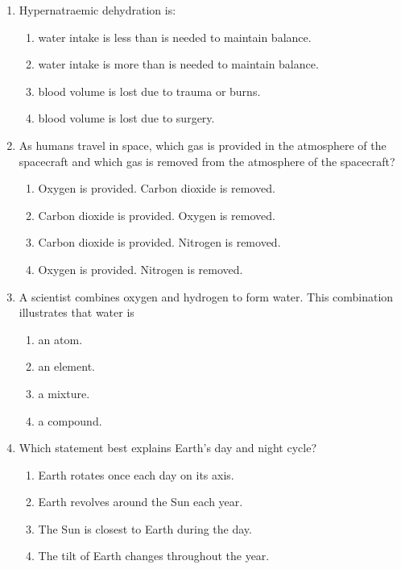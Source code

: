 \documentclass[12pt]{article}
\begin{document}
\begin{enumerate}[label=\arabic*.]
\begin{enumerate}[label=(\alph*)]
    \item enzymes in the lysosome are released to the cytosol
    \item protons are actively pumped into the lysosome
\end{enumerate}
\item Hypernatraemic dehydration is:
\begin{enumerate}[label=(\alph*)]
    \item water intake is less than is needed to maintain balance.
    \item water intake is more than is needed to maintain balance.
    \item blood volume is lost due to trauma or burns.
    \item blood volume is lost due to surgery.
\end{enumerate}
\item As humans travel in space, which gas is provided in the atmosphere of the spacecraft and which gas is removed from the atmosphere of the spacecraft?
\begin{enumerate}[label=(\alph*)]
    \item Oxygen is provided. Carbon dioxide is removed.
    \item Carbon dioxide is provided. Oxygen is removed.
    \item Carbon dioxide is provided. Nitrogen is removed.
    \item Oxygen is provided. Nitrogen is removed.
\end{enumerate}
\item A scientist combines oxygen and hydrogen to form water. This combination illustrates that water is
\begin{enumerate}[label=(\alph*)]
    \item an atom.
    \item an element.
    \item a mixture.
    \item a compound.
\end{enumerate}
\item Which statement best explains Earth's day and night cycle?
\begin{enumerate}[label=(\alph*)]
    \item Earth rotates once each day on its axis.
    \item Earth revolves around the Sun each year.
    \item The Sun is closest to Earth during the day.
    \item The tilt of Earth changes throughout the year.

\end{enumerate}
\end{enumerate}
\end{document}
